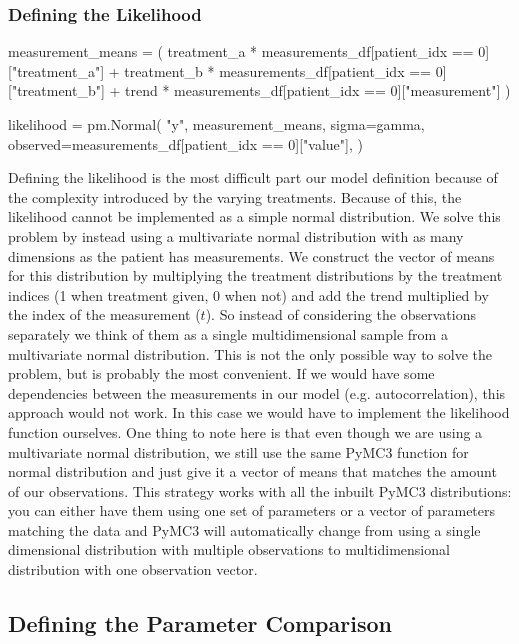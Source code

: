 \documentclass[12pt,a4paper,leqno]{report}
\theoremstyle{plain}
\theoremstyle{definition}
\theoremstyle{remark}
\begin{document}
\subsubsection{Defining the Likelihood}

\bigskip
\begin{pyverbatim}
measurement_means = (
    treatment_a
    * measurements_df[patient_idx == 0]["treatment_a"]
    + treatment_b
    * measurements_df[patient_idx == 0]["treatment_b"]
    + trend
    * measurements_df[patient_idx == 0]["measurement"]
)

likelihood = pm.Normal(
    "y",
    measurement_means,
    sigma=gamma,
    observed=measurements_df[patient_idx == 0]["value"],
)
\end{pyverbatim}
\bigskip

Defining the likelihood is the most difficult part our model definition because of the
complexity introduced by the varying treatments. Because of this, the likelihood cannot
be implemented as a simple normal distribution. We solve this problem by instead using a
multivariate normal distribution with as many dimensions as the patient has
measurements. We construct the vector of means for this distribution by multiplying the
treatment distributions by the treatment indices (1 when
treatment given, 0 when not) and add the trend multiplied by the index of the
measurement (\(t\)). So instead of considering
the observations separately we think of them as a single multidimensional sample from
a multivariate normal distribution. This is not the only possible way to solve the
problem, but is probably the most convenient. If we would have some
dependencies between the measurements in our model (e.g. autocorrelation), this approach
would not work. In this case we would have to implement the likelihood function
ourselves. One thing to note here is that even though we are using a multivariate normal
distribution, we still use the same PyMC3 function for normal distribution and just give
it a vector of means that matches the amount of our observations. This strategy works
with all the inbuilt PyMC3 distributions: you can either have them using one set of
parameters or a vector of parameters matching the data and PyMC3 will automatically
change from using a single dimensional distribution with multiple observations to
multidimensional distribution with one observation vector.

\subsection{Defining the Parameter Comparison}
\end{document}
